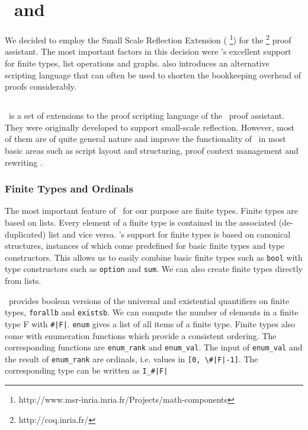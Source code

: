 \chapter{\coq\ and \ssreflect}
\label{chap:coq}


We decided to employ the Small Scale Reflection Extension (\textbf{\ssreflect}%
\footnote{http://www.msr-inria.inria.fr/Projects/math-components})
for the \textbf{\coq}%
\footnote{http://coq.inria.fr/}
proof assistant. 
The most important factors in this decision were \ssreflect's excellent support for finite types, list operations and graphs. \ssreflect{} also introduces an alternative scripting language that can often be used to shorten the bookkeeping overhead of proofs considerably.

\section{\coq}



\section{\ssreflect}


\ssreflect\ is a set of extensions to the proof scripting language of the \coq\ proof assistant. 
They were originally developed to support small-scale reflection. 
However, most of them are of quite general nature and improve the functionality of \coq\ in most basic areas such as script layout and structuring, proof context management and rewriting \cite{gonthier:inria-00258384}.

\subsection{Finite Types and Ordinals}

The most important feature of \ssreflect\ for our purpose are finite types. 
Finite types are based on lists. 
Every element of a finite type is contained in the associated (de-duplicated) list and vice versa.
\ssreflect's support for finite types is based on canonical structures, instances of which come predefined for basic finite types and type constructors. 
This allows us to easily combine basic finite types such as \lstinline{bool} with type constructors such as \lstinline{option} and \lstinline{sum}. 
We can also create finite types directly from lists.

\ssreflect\ provides boolean versions of the universal and existential quantifiers on finite types, \lstinline{forallb} and \lstinline{existsb}.
We can compute the number of elements in a finite type F with \lstinline{#|F|}.
\lstinline{enum} gives a list of all items of a finite type. 
Finite types also come with enumeration functions which provide a consistent ordering. 
The corresponding functions are \lstinline{enum_rank} and \lstinline{enum_val}. 
The input of \lstinline{enum_val} and the result of \lstinline{enum_rank} are ordinals, i.e. values in \lstinline{[0, \#|F|-1]}. 
The corresponding type can be written as \lstinline{I_#|F|}

